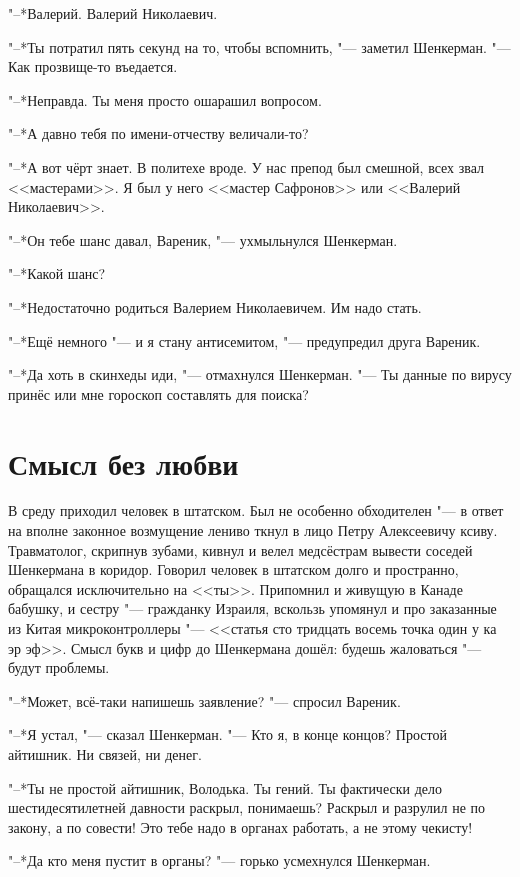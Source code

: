 "--*Валерий.
Валерий Николаевич.

"--*Ты потратил пять секунд на то, чтобы вспомнить, "--- заметил Шенкерман. 
"--- Как прозвище-то въедается.

"--*Неправда.
Ты меня просто ошарашил вопросом.

"--*А давно тебя по имени-отчеству величали-то?

"--*А вот чёрт знает.
В политехе вроде.
У нас препод был смешной, всех звал <<мастерами>>.
Я был у него <<мастер Сафронов>> или <<Валерий Николаевич>>.

"--*Он тебе шанс давал, Вареник, "--- ухмыльнулся Шенкерман.

"--*Какой шанс?

"--*Недостаточно родиться Валерием Николаевичем.
Им надо стать.

"--*Ещё немного "--- и я стану антисемитом, "--- предупредил друга Вареник.

"--*Да хоть в скинхеды иди, "--- отмахнулся Шенкерман.
"--- Ты данные по вирусу принёс или мне гороскоп составлять для поиска?

\section{Смысл без любви}

В среду приходил человек в штатском.
Был не особенно обходителен "--- в ответ на вполне законное возмущение лениво ткнул в лицо Петру Алексеевичу ксиву.
Травматолог, скрипнув зубами, кивнул и велел медсёстрам вывести соседей Шенкермана в коридор.
Говорил человек в штатском долго и пространно, обращался исключительно на <<ты>>.
Припомнил и живущую в Канаде бабушку, и сестру "--- гражданку Израиля, вскользь упомянул и про заказанные из Китая микроконтроллеры "--- <<статья сто тридцать восемь точка один у ка эр эф>>.
Смысл букв и цифр до Шенкермана дошёл: будешь жаловаться "--- будут проблемы.

"--*Может, всё-таки напишешь заявление? "--- спросил Вареник.

"--*Я устал, "--- сказал Шенкерман.
"--- Кто я, в конце концов?
Простой айтишник.
Ни связей, ни денег.

"--*Ты не простой айтишник, Володька.
Ты гений.
Ты фактически дело шестидесятилетней давности раскрыл, понимаешь?
Раскрыл и разрулил не по закону, а по совести!
Это тебе надо в органах работать, а не этому чекисту!

"--*Да кто меня пустит в органы? "--- горько усмехнулся Шенкерман.


